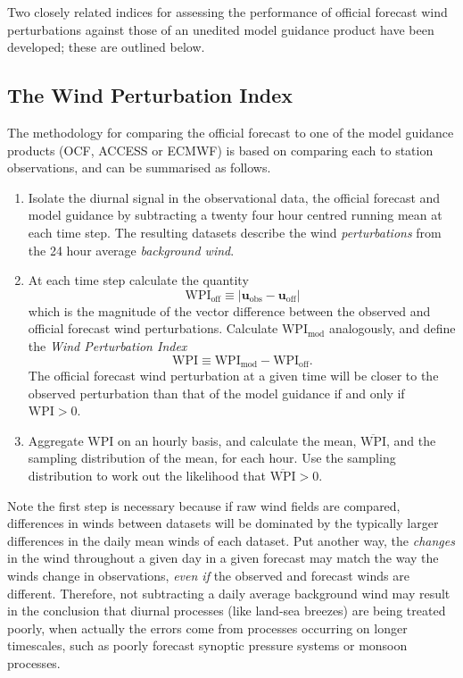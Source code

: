 \documentclass[10pt]{article}
\begin{document}
Two closely related indices for assessing the performance of official forecast wind perturbations against those of an unedited model guidance product have been developed; these are outlined below. 

\subsection{The Wind Perturbation Index}\label{daily-performance}
The methodology for comparing the official forecast to one of the model
guidance products (OCF, ACCESS or ECMWF) is based on comparing each to station
observations, and can be summarised as follows. 
\begin{enumerate}
\item
Isolate the diurnal signal in the observational data, the official forecast and model guidance by subtracting a twenty four hour centred running mean at each time step. The resulting datasets describe the wind \emph{perturbations} from the 24 hour average \emph{background wind}. 
\item
At each time step calculate the quantity
\begin{equation}
\text{WPI}_{\text{off}} \equiv \left\lvert \boldsymbol{u}_{\text{obs}}-\boldsymbol{u}_{\text{off}} \right\rvert 
\end{equation}
which is the magnitude of the vector difference between the observed and
official forecast wind perturbations. Calculate
\(\text{WPI}_{\text{mod}}\) analogously, and define the \emph{Wind
Perturbation Index}
\begin{equation}
\text{WPI} \equiv \text{WPI}_{\text{mod}} - \text{WPI}_{\text{off}}.
\end{equation}
The official forecast wind perturbation at a given time will be closer
to the observed perturbation than that of the model guidance if and only if \(\text{WPI} > 0\). 
\item
Aggregate \(\text{WPI}\) on an hourly basis, and calculate the mean, $\overline{\text{WPI}}$, and the sampling distribution of the mean, for each hour. Use the sampling distribution to work out the likelihood that $\overline{\text{WPI}} > 0$.    
\end{enumerate}

Note the first step is necessary because if raw wind fields are compared, differences in winds between datasets will be dominated by the typically larger differences in the daily mean winds of each dataset.
Put another way, the \emph{changes} in the wind throughout a given day in a given forecast may match the way the winds change in observations, \emph{even if} the observed and forecast winds are different. Therefore, not subtracting a daily average background wind may result in the conclusion that diurnal processes (like land-sea breezes) are being treated poorly, when actually the errors come from processes occurring on longer timescales, such as poorly forecast synoptic pressure systems or monsoon processes. 
\end{document}
